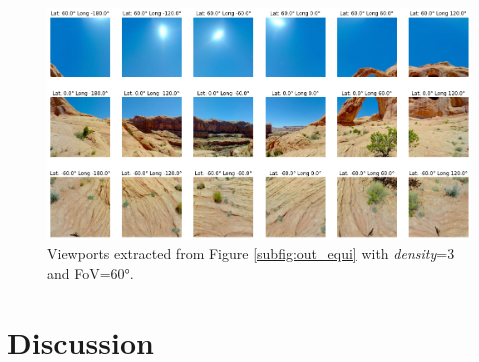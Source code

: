 \begin{figure}[!ht]
    \centering
    \includegraphics[width=1\linewidth]{img/video360/viewports.png}
    \caption{Viewports extracted from Figure \ref{subfig:out_equi} with \emph{density}=3 and FoV=60°.}
    \label{fig:authoring_viewports}
\end{figure}
\section{Discussion}


\label{sec:authoring_discussion}